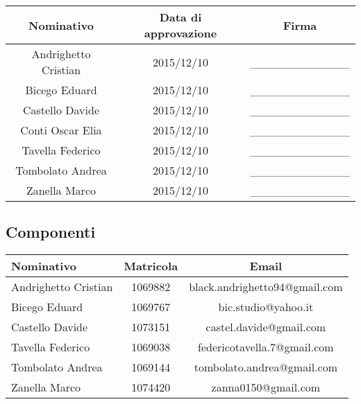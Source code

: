 \documentclass[../PianoProgetto.tex]{subfiles}
\begin{document}
\begin{appendices}
\begin{table}[h]
		\begin{tabularx}{\textwidth}{C C C}
			\toprule
			\textbf{Nominativo} & \textbf{Data di approvazione} & \textbf{Firma} \\
			\midrule
			Andrighetto Cristian & 2015/12/10 &	\_\_\_\_\_\_\_\_\_\_\_\_ \\[1.2ex]
			Bicego Eduard & 2015/12/10 & \_\_\_\_\_\_\_\_\_\_\_\_ \\[1.2ex]
			Castello Davide	& 2015/12/10 & \_\_\_\_\_\_\_\_\_\_\_\_ \\[1.2ex]
			Conti Oscar Elia & 2015/12/10 &	 \_\_\_\_\_\_\_\_\_\_\_\_ \\[1.2ex]
			Tavella Federico & 2015/12/10 &	 \_\_\_\_\_\_\_\_\_\_\_\_ \\[1.2ex]
			Tombolato Andrea & 2015/12/10 &	 \_\_\_\_\_\_\_\_\_\_\_\_ \\[1.2ex]
			Zanella Marco & 2015/12/10 &	\_\_\_\_\_\_\_\_\_\_\_\_ \\[1.2ex]
			\bottomrule
		\end{tabularx}
		
	\end{table}
				
	\clearpage
	
	\subsection{Componenti}
	
		\begin{table}[h]
	
		\begin{tabularx}{\textwidth}{lc C}
			\toprule
			\textbf{Nominativo} & \textbf{Matricola} & \textbf{Email} \\
			\midrule
			Andrighetto Cristian & 1069882 & black.andrighetto94@gmail.com \\
			Bicego Eduard & 1069767 & bic.studio@yahoo.it  \\
			Castello Davide	& 1073151 &	 castel.davide@gmail.com\\
			Tavella Federico & 1069038 & federicotavella.7@gmail.com\\
			Tombolato Andrea & 1069144 & tombolato.andrea@gmail.com	 \\
			Zanella Marco & 1074420 & zanna0150@gmail.com \\
			\bottomrule
		\end{tabularx}
		

\end{table}
\end{appendices}
\end{document}
